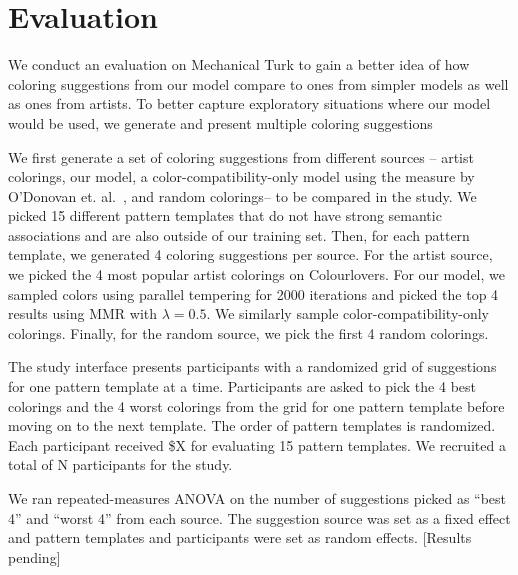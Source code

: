 \section{Evaluation}
\label{sec:evaluation}


We conduct an evaluation on Mechanical Turk to gain a better idea of how coloring suggestions from our model compare to ones from simpler models as well as ones from artists.
To better capture exploratory situations where our model would be used, we generate and present multiple coloring suggestions 

We first generate a set of coloring suggestions from different sources -- artist colorings, our model, a color-compatibility-only model using the measure by O'Donovan et. al.~, and random colorings-- to be compared in the study. We picked 15 different pattern templates that do not have strong semantic associations and are also outside of our training set. Then, for each pattern template, we generated 4 coloring suggestions per source. For the artist source, we picked the 4 most popular artist colorings on Colourlovers. For our model, we sampled colors using parallel tempering for 2000 iterations and picked the top 4 results using MMR with $\lambda = 0.5$. We similarly sample color-compatibility-only colorings. Finally, for the random source, we pick the first 4 random colorings.

The study interface presents participants with a randomized grid of suggestions for one pattern template at a time. Participants are asked to pick the 4 best colorings and the 4 worst colorings from the grid for one pattern template before moving on to the next template. The order of pattern templates is randomized. Each participant received \$X for evaluating 15 pattern templates. We recruited a total of N participants for the study.

We ran repeated-measures ANOVA on the number of suggestions picked as ``best 4'' and ``worst 4'' from each source. The suggestion source was set as a fixed effect and pattern templates and participants were set as random effects. [Results pending]